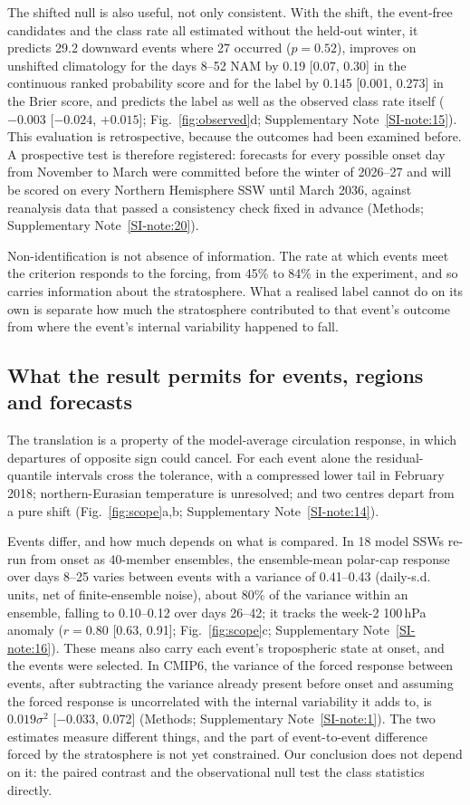 \documentclass[11pt]{article}
\begin{document}
The shifted null is also useful, not only consistent. With the shift, the event-free candidates and the class rate all estimated without the held-out winter, it predicts 29.2 downward events where 27 occurred ($p = 0.52$), improves on unshifted climatology for the days 8--52 NAM by 0.19 [0.07, 0.30] in the continuous ranked probability score and for the label by 0.145 [0.001, 0.273] in the Brier score, and predicts the label as well as the observed class rate itself ($-0.003$ [$-0.024$, $+0.015$]; Fig.~\ref{fig:observed}d; Supplementary Note~\ref{SI-note:15}). This evaluation is retrospective, because the outcomes had been examined before. A prospective test is therefore registered: forecasts for every possible onset day from November to March were committed before the winter of 2026--27 and will be scored on every Northern Hemisphere SSW until March 2036, against reanalysis data that passed a consistency check fixed in advance (Methods; Supplementary Note~\ref{SI-note:20}).

Non-identification is not absence of information. The rate at which events meet the criterion responds to the forcing, from 45\% to 84\% in the experiment, and so carries information about the stratosphere. What a realised label cannot do on its own is separate how much the stratosphere contributed to that event's outcome from where the event's internal variability happened to fall.

\subsection*{What the result permits for events, regions and forecasts}

The translation is a property of the model-average circulation response, in which departures of opposite sign could cancel. For each event alone the residual-quantile intervals cross the tolerance, with a compressed lower tail in February 2018; northern-Eurasian temperature is unresolved; and two centres depart from a pure shift (Fig.~\ref{fig:scope}a,b; Supplementary Note~\ref{SI-note:14}).

Events differ, and how much depends on what is compared. In 18 model SSWs re-run from onset as 40-member ensembles\cite{loeffel26}, the ensemble-mean polar-cap response over days 8--25 varies between events with a variance of 0.41--0.43 (daily-s.d. units, net of finite-ensemble noise), about 80\% of the variance within an ensemble, falling to 0.10--0.12 over days 26--42; it tracks the week-2 100\,hPa anomaly ($r = 0.80$ [0.63, 0.91]; Fig.~\ref{fig:scope}c; Supplementary Note~\ref{SI-note:16}). These means also carry each event's tropospheric state at onset, and the events were selected. In CMIP6, the variance of the forced response between events, after subtracting the variance already present before onset and assuming the forced response is uncorrelated with the internal variability it adds to, is $0.019\sigma^2$ [$-0.033$, 0.072] (Methods; Supplementary Note~\ref{SI-note:1}). The two estimates measure different things, and the part of event-to-event difference forced by the stratosphere is not yet constrained. Our conclusion does not depend on it: the paired contrast and the observational null test the class statistics directly.
\end{document}
